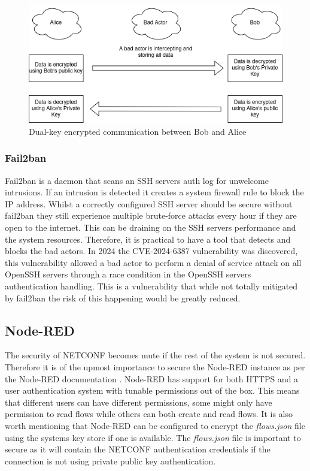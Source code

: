 \documentclass[12pt]{article}
\begin{document}
\begin{figure}
  \centering
  \includegraphics[width=\textwidth]{dual-key.png}
  \caption{Dual-key encrypted communication between Bob and Alice}
  \label{fig:dual-key}
\end{figure}

\subsubsection{Fail2ban}
Fail2ban is a daemon \cite{Fail2banFail2ban2025} that scans an SSH servers auth log for 
unwelcome intrusions. If an intrusion is detected it creates a system firewall rule to block the IP address.
Whilst a correctly configured SSH server should be secure without fail2ban they still experience multiple brute-force attacks
every hour if they are open to the internet. This can be draining on the SSH servers performance and the system resources.
Therefore, it is practical to have a tool that detects and blocks the bad actors. In 2024 the CVE-2024-6387 \cite{CVERecordCVE20246387} vulnerability
was discovered, this vulnerability allowed a bad actor to perform a denial of service attack on all OpenSSH servers through 
a race condition in the OpenSSH servers authentication handling. This is a vulnerability that while not 
totally mitigated by fail2ban the risk of this happening would be greatly reduced.

\subsection{Node-RED}
The security of NETCONF becomes mute if the rest of the system is not secured. Therefore it is of the upmost 
importance to secure the Node-RED instance as per the Node-RED documentation \cite{SecuringNodeREDNodeRED}.
Node-RED has support for both HTTPS and a user authentication system with tunable permissions out of the box.
This means that different users can have different permissions, some might only have permission to read flows while others
can both create and read flows. It is also worth mentioning that Node-RED can be configured to encrypt the \textit{flows.json} file using 
the systems key store if one is available. The \textit{flows.json} file is important to secure as it will contain the NETCONF authentication credentials
if the connection is not using private public key authentication. 
\end{document}
